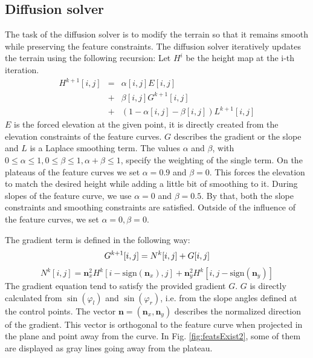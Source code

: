 \documentclass[journal, letterpaper]{IEEEtran}
\begin{document}
\subsection{Diffusion solver}\label{DiffusionSolver}
The task of the diffusion solver is to modify the terrain so that it remains smooth while preserving the feature constraints.
The diffusion solver iteratively updates the terrain using the following recursion: Let $H^i$ be the height map at the i-th iteration.
\begin{equation}
\begin{array}{rcl}
	H^{k+1}[i,j] &=& \alpha[i,j] E[i,j]  \\
	             &+& \beta[i,j] G^{k+1}[i,j]  \\
							 &+& (1-\alpha[i,j]-\beta[i,j]) L^{k+1}[i,j]
\end{array}
\label{eq:Diffusion1}
\end{equation}
$E$ is the forced elevation at the given point, it is directly created from the elevation constraints of the feature curves.
$G$ describes the gradient or the slope and $L$ is a Laplace smoothing term.
The values $\alpha$ and $\beta$, with $0\leq\alpha\leq 1, 0\leq\beta\leq 1, \alpha+\beta\leq 1$, specify the weighting of the single term. On the plateaus of the feature curves we set $\alpha=0.9$ and $\beta=0$. This forces the elevation to match the desired height while adding a little bit of smoothing to it. During slopes of the feature curve, we use $\alpha=0$ and $\beta=0.5$. By that, both the slope constraints and smoothing constraints are satisfied. Outside of the influence of the feature curves, we set $\alpha=0, \beta=0$.

The gradient term is defined in the following way:
\begin{equation}
	G^{k+1}[i,j] = N^k[i,j]+G[i,j] \newline
\label{eq:Diffusion2}
\end{equation}
\begin{equation}
	N^k[i,j] = \textbf{n}_x^2 H^k[i-\text{sign}(\textbf{n}_x),j] + \textbf{n}_y^2 H^k[i, j-\text{sign}(\textbf{n}_y)]
\label{eq:Diffusion3}
\end{equation}
The gradient equation tend to satisfy the provided gradient $G$. $G$ is directly calculated from $\sin(\varphi_l)$ and $\sin(\varphi_r)$, i.e. from the slope angles defined at the control points.
The vector $\textbf{n}=(\textbf{n}_x,\textbf{n}_y)$ describes the normalized direction of the gradient. This vector is orthogonal to the feature curve when projected in the plane and point away from the curve. In Fig. \ref{fig:featsExist2}, some of them are displayed as gray lines going away from the plateau.
\end{document}

